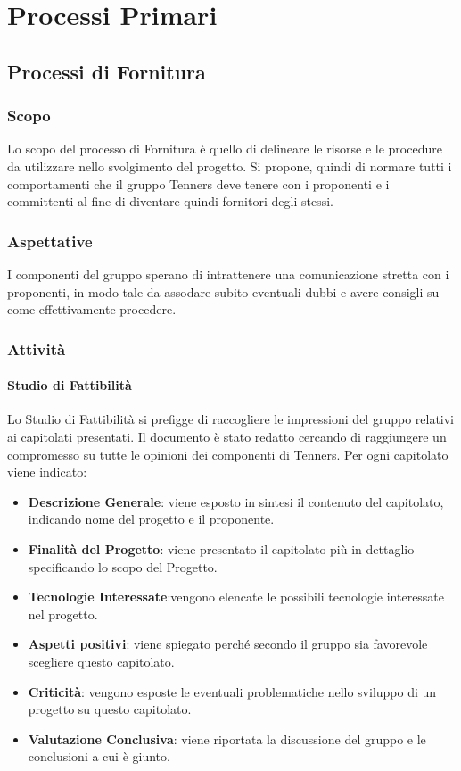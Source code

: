 \section{Processi Primari}
\subsection{Processi di Fornitura}
\subsubsection{Scopo}
Lo scopo del processo di Fornitura è quello di delineare le risorse e le procedure da utilizzare nello svolgimento del progetto. Si propone, quindi di normare tutti i comportamenti che il gruppo Tenners deve tenere con i proponenti e i committenti al fine di diventare quindi fornitori degli stessi.
\subsubsection{Aspettative}
I componenti del gruppo sperano di intrattenere una comunicazione stretta con i proponenti, in modo tale da assodare subito eventuali dubbi e avere consigli su come effettivamente procedere.
\subsubsection{Attività}
\paragraph{Studio di Fattibilità}
Lo Studio di Fattibilità si prefigge di raccogliere le impressioni del gruppo relativi ai capitolati presentati. Il documento è stato redatto cercando di raggiungere un compromesso su tutte le opinioni dei componenti di Tenners. Per ogni capitolato viene indicato:
\begin{itemize}
  \item \textbf{Descrizione Generale}: viene esposto in sintesi il contenuto del capitolato, indicando nome del progetto e il proponente.
  \item \textbf{Finalità del Progetto}: viene presentato il capitolato più in dettaglio specificando lo scopo del Progetto.
  \item \textbf{Tecnologie Interessate}:vengono elencate le possibili tecnologie interessate nel progetto.
  \item \textbf{Aspetti positivi}: viene spiegato perché secondo il gruppo sia favorevole scegliere questo capitolato.
  \item \textbf{Criticità}: vengono esposte le eventuali problematiche nello sviluppo di un progetto su questo capitolato.
  \item \textbf{Valutazione Conclusiva}: viene riportata la discussione del gruppo e le conclusioni a cui è giunto.
\end{itemize}
